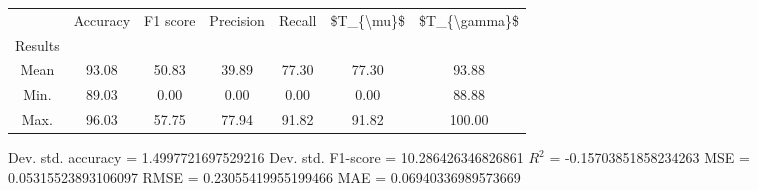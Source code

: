 \begin{tabular}{|c|c|c|c|c|c|c|}
\toprule
{} &  Accuracy &  F1 score &  Precision &  Recall &  \$T\_\{\textbackslash mu\}\$ &  \$T\_\{\textbackslash gamma\}\$ \\
Results &           &           &            &         &            &               \\
\hline
Mean    &     93.08 &     50.83 &      39.89 &   77.30 &      77.30 &         93.88 \\
Min.    &     89.03 &      0.00 &       0.00 &    0.00 &       0.00 &         88.88 \\
Max.    &     96.03 &     57.75 &      77.94 &   91.82 &      91.82 &        100.00 \\
\bottomrule
\end{tabular}

 Dev. std. accuracy = 1.4997721697529216
 Dev. std. F1-score = 10.286426346826861
 $R^2$ = -0.15703851858234263
 MSE = 0.05315523893106097
 RMSE = 0.23055419955199466
 MAE = 0.06940336989573669